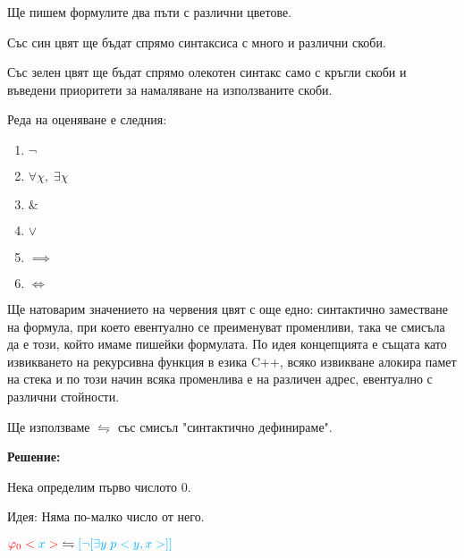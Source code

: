 \documentclass{article}[12pt]
\begin{document}
\vspace{0.5cm}

Ще пишем формулите два пъти с различни цветове.

Със \color{cyan} син \color{black} цвят ще бъдат спрямо синтаксиса с много и различни скоби.

Със \color{green} зелен \color{black} цвят ще бъдат спрямо олекотен синтакс само с кръгли скоби и въведени приоритети за намаляване на използваните скоби.

Реда на оценяване е следния:

\begin{enumerate}
\item \(\neg\)
\item \(\forall \chi, \; \exists \chi\)
\item \(\&\)
\item \(\lor\)
\item \(\implies\)
\item \(\iff\)
\end{enumerate}

Ще натоварим значението на \color{red} червения \color{black} цвят с още едно:
синтактично заместване на формула, при което евентуално се преименуват променливи,
така че смисъла да е този, който имаме пишейки формулата.
По идея концепцията е същата като извикването на рекурсивна функция в езика C++,
всяко извикване алокира памет на стека и по този начин всяка променлива е на различен адрес,
евентуално с различни стойности.

\vspace{0.5cm}

Ще използваме \(\leftrightharpoons\) със смисъл "синтактично дефинираме".

\vspace{0.3cm}

\textbf{Решение:}

\vspace{0.3cm}

Нека определим първо числото \(0\).

\vspace{0.3cm}

Идея: Няма по-малко число от него.

\vspace{0.3cm}

\(\color{red} \varphi_0<\color{cyan} x \color{red}> \color{black} \; \leftrightharpoons  \color{cyan}  [\lnot [\exists y \; p<y, x>] ] \)

\vspace{0.3cm}
\end{document}
